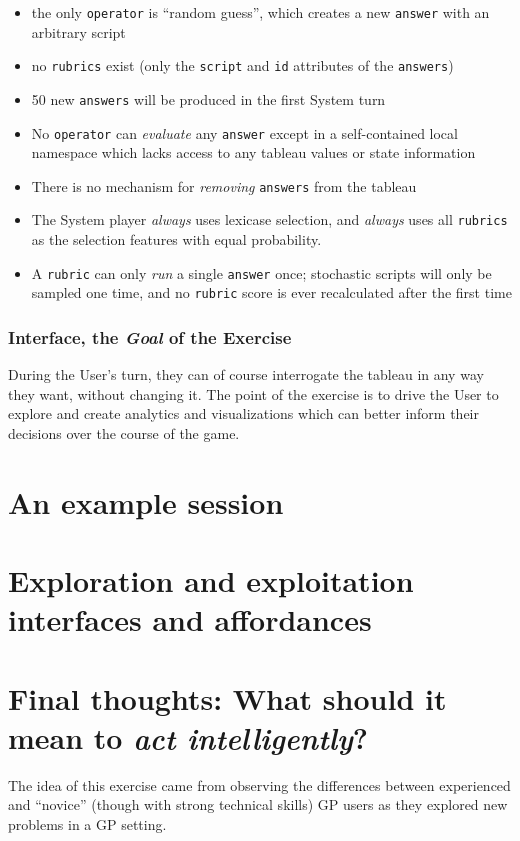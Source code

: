 \begin{itemize}
\item the only {\tt operator} is ``random guess'', which creates a new {\tt answer} with an arbitrary script
\item no {\tt rubrics} exist (only the {\tt script} and {\tt id} attributes of the {\tt answers})
\item 50 new {\tt answers} will be produced in the first System turn
\item No {\tt operator} can \emph{evaluate} any {\tt answer} except in a self-contained local namespace which lacks access to any tableau values or state information
\item There is no mechanism for \emph{removing} {\tt answers} from the tableau
\item The System player \emph{always} uses lexicase selection, and \emph{always} uses all {\tt rubrics} as the selection features with equal probability.
\item A {\tt rubric} can only \emph{run} a single {\tt answer} once; stochastic scripts will only be sampled one time, and no {\tt rubric} score is ever recalculated after the first time
\end{itemize}

\subsubsection{Interface, the \emph{Goal} of the Exercise}\hypertarget{interface-the-goal-of-the-exercise}{}\label{interface-the-goal-of-the-exercise}

During the User's turn, they can of course interrogate the tableau in any way they want, without changing it. The point of the exercise is to drive the User to explore and create analytics and visualizations which can better inform their decisions over the course of the game.

\section{An example session}\hypertarget{an-example-session}{}\label{an-example-session}

\section{Exploration and exploitation interfaces and affordances}\hypertarget{exploration-and-exploitation-interfaces-and-affordances}{}\label{exploration-and-exploitation-interfaces-and-affordances}

\section{Final thoughts: What should it mean to \emph{act intelligently}?}\hypertarget{final-thoughts-what-should-it-mean-to-act-intelligently}{}\label{final-thoughts-what-should-it-mean-to-act-intelligently}

The idea of this exercise came from observing the differences between experienced and ``novice'' (though with strong technical skills) GP users as they explored new problems in a GP setting.

